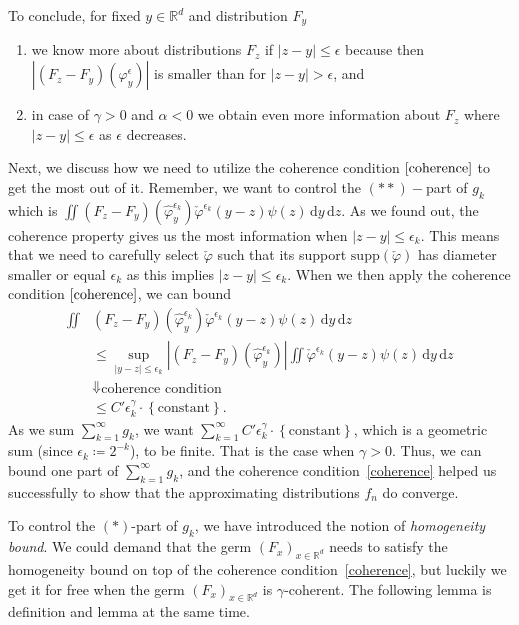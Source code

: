 To conclude, for fixed \(y \in \mathbb{R}^d\) and distribution \(F_y\)
\begin{enumerate}
    \item we know more about distributions \(F_z\) if \(|z - y | \leq \epsilon\) because then \(|(F_z - F_y)(\varphi^\epsilon_y)|\) is smaller than for \(|z - y| > \epsilon\), and
    \item in case of \(\gamma > 0\) and \(\alpha < 0\) we obtain even more information about \(F_z\) where \(|z - y | \leq \epsilon\)  as \(\epsilon\) decreases.
\end{enumerate}

Next, we discuss how we need to utilize the coherence condition \(\eqref{coherence}\) to get the most out of it. Remember, we want to control the \((**)-\)part of \(g_k\) which is \( \iint (F_z - F_y)(\hat \varphi^{\epsilon_k}_y) \check \varphi^{\epsilon_k}(y-z) \psi(z) \, \mathrm{d}y\, \mathrm{d}z\). As we found out, the coherence property gives us the most information when \(|z - y| \leq \epsilon_k\). This means that we need to carefully select \(\check \varphi\) such that its support \(\mathrm{supp}(\check \varphi)\) has diameter smaller or equal \(\epsilon_k\) as this implies \(|z-y| \leq \epsilon_k\). When we then apply the coherence condition \(\eqref{coherence}\), we can bound 
\begin{align*}
    \iint &(F_z - F_y)(\hat \varphi^{\epsilon_k}_y) \check \varphi^{\epsilon_k}(y-z) \psi(z) \, \mathrm{d}y\, \mathrm{d}z 
    \\ & \leq \sup_{|y-z|\leq \epsilon_k}|(F_z -F_y)(\hat \varphi^{\epsilon_k}_y)| \iint  \check \varphi^{\epsilon_k}(y-z) \psi(z) \, \mathrm{d}y\, \mathrm{d}z    \\
    &\Downarrow \text{coherence condition}
    \\ &\leq C' \epsilon_k^{\gamma} \cdot \left \{ \text{constant} \right \}.
\end{align*}
As we sum \(\sum^\infty_{k=1} g_k\), we want \(\sum^\infty_{k=1} C' \epsilon_k^{\gamma} \cdot \left\{ \text{constant} \right\}\), which is a geometric sum (since \(\epsilon_k \coloneqq 2^{-k}\)), to be finite. That is the case when \(\gamma > 0\). Thus, we can bound one part of \(\sum^\infty_{k=1} g_k\), and the coherence condition~\eqref{coherence} helped us successfully to show that the approximating distributions \(f_n\) do converge.

To control the \((*)\)-part of \(g_k\), we have introduced the notion of \emph{homogeneity bound}. We could demand that the germ \({(F_x)}_{x \in \mathbb{R}^d}\) needs to satisfy the homogeneity bound on top of the coherence condition~\eqref{coherence}, but luckily we get it for free when the germ \({(F_x)}_{x \in \mathbb{R}^d}\) is \(\gamma\)-coherent. The following lemma is definition and lemma at the same time.

